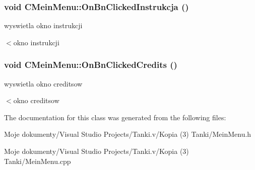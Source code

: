 \subsubsection{\setlength{\rightskip}{0pt plus 5cm}void CMeinMenu::OnBnClickedInstrukcja ()}\label{class_c_mein_menu_c22e31ea265a2b1c245cc7cb49c9bda9}


wyswietla okno instrukcji 



$<$okno instrukcji 
\subsubsection{\setlength{\rightskip}{0pt plus 5cm}void CMeinMenu::OnBnClickedCredits ()}\label{class_c_mein_menu_4219e07d367923ef93fe9f0fcf0c6d5f}


wyswietla okno creditsow 



$<$okno creditsow 

The documentation for this class was generated from the following files:\begin{CompactItemize}
\item 
Moje dokumenty/Visual Studio Projects/Tanki.v/Kopia (3) Tanki/MeinMenu.h\item 
Moje dokumenty/Visual Studio Projects/Tanki.v/Kopia (3) Tanki/MeinMenu.cpp\end{CompactItemize}
